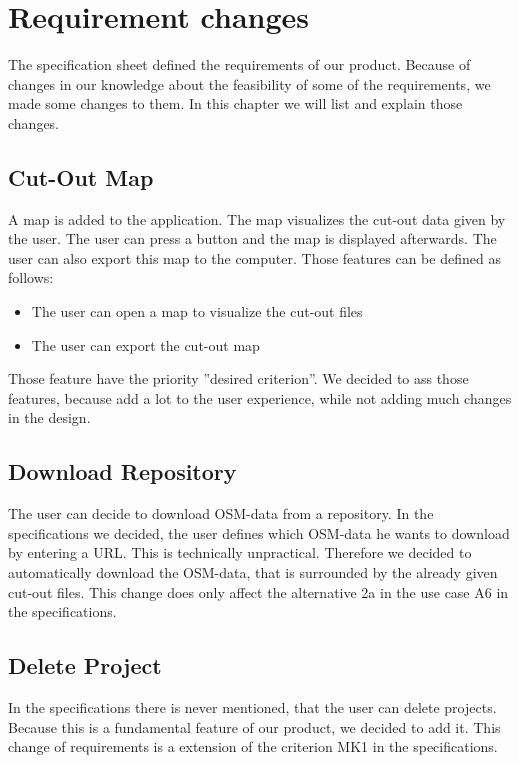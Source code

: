 \documentclass[letterpaper,10pt,english]{sphinxmanual}
\begin{document}
\chapter{Requirement changes}
\label{\detokenize{index:requirement-changes}}
\sphinxstepscope
The specification sheet defined the requirements of our product. Because of changes in our knowledge about the feasibility of some of the requirements, we made some changes to them. In this chapter we will list and explain those changes.

\section{Cut-Out Map}
A map is added to the application. The map visualizes the cut-out data given by the user. The user can press a button and the map is displayed afterwards. The user can also export this map to the computer. Those features can be defined as follows:
\begin{itemize}
    \item <WK9> The user can open a map to visualize the cut-out files
    \item <WK10> The user can export the cut-out map
\end{itemize}
Those feature have the priority ''desired criterion''. We decided to ass those features, because add a lot to the user experience, while not adding much changes in the design.

\section{Download Repository}
The user can decide to download OSM-data from a repository. In the specifications we decided, the user defines which OSM-data he wants to download by entering a URL. This is technically unpractical. Therefore we decided to automatically download the OSM-data, that is surrounded by the already given cut-out files. This change does only affect the alternative 2a in the use case A6 in the specifications.

\section{Delete Project}
In the specifications there is never mentioned, that the user can delete projects. Because this is a fundamental feature of our product, we decided to add it. This change of requirements is a extension of the criterion MK1 in the specifications.
\end{document}
